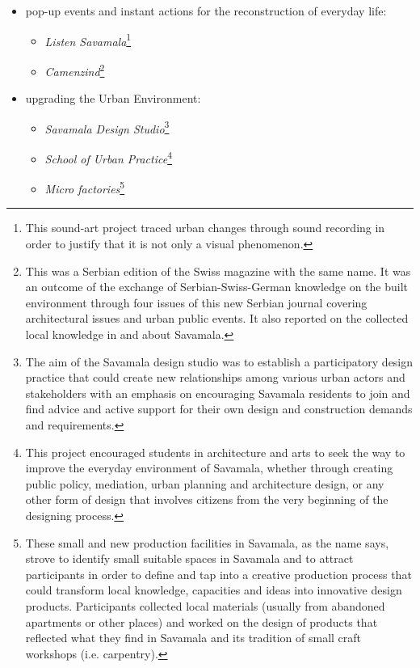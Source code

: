 \documentclass[11pt]{report}
\begin{document}
\begin{itemize}
\item pop-up events and instant actions for the reconstruction of everyday life:

\begin{itemize}
\item \textit{Listen Savamala}\footnote{This sound-art project traced urban changes through sound recording in order to justify that it is not only a visual phenomenon.}

\item \textit{Camenzind}\footnote{This was a Serbian edition of the Swiss magazine with the same name. It was an outcome of the exchange of Serbian-Swiss-German knowledge on the built environment through four issues of this new Serbian journal covering architectural issues and urban public events. It also reported on the collected local knowledge in and about Savamala.}
\end{itemize}

\item upgrading the Urban Environment:
\begin{itemize}
\item \textit{Savamala Design Studio}\footnote{The aim of the Savamala design studio was to establish a participatory design practice that could create new relationships among various urban actors and stakeholders with an emphasis on encouraging Savamala residents to join and find advice and active support for their own design and construction demands and requirements.}

\item \textit{School of Urban Practice}\footnote{This project encouraged students in architecture and arts to seek the way to improve the everyday environment of Savamala, whether through creating public policy, mediation, urban planning and architecture design, or any other form of design that involves citizens from the very beginning of the designing process.}

\item \textit{Micro factories}\footnote{These small and new production facilities in Savamala, as the name says, strove to identify small suitable spaces in Savamala and to attract participants in order to define and tap into a creative production process that could transform local knowledge, capacities and ideas into innovative design products.
Participants collected local materials (usually from abandoned apartments or other places) and worked on the design of products that reflected what they find in Savamala and its tradition of small craft workshops (i.e. carpentry).}
\end{itemize}
\end{itemize}
\end{document}
